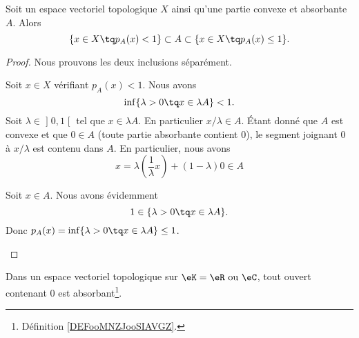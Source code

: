 \begin{lemma}			\label{LEMooFUXVooJumScW}
	Soit un espace vectoriel topologique \( X\) ainsi qu'une partie convexe et absorbante \( A\). Alors
	\begin{equation}
		\{ x\in X\tq p_A(x)<1 \}\subset A\subset\{ x\in X\tq p_A(x)\leq 1 \}.
	\end{equation}
\end{lemma}

\begin{proof}
	Nous prouvons les deux inclusions séparément.
	\begin{subproof}
		Soit \( x\in X\) vérifiant \( p_A(x)<1\). Nous avons
		\begin{equation}
			\inf\{ \lambda>0\tq x\in \lambda A \}<1.
		\end{equation}
		Soit \( \lambda\in \mathopen] 0,1\mathclose[\) tel que \( x\in \lambda A\). En particulier \( x/\lambda\in A\). Étant donné que \( A\) est convexe et que \( 0\in A\) (toute partie absorbante contient \( 0\)), le segment joignant \( 0\) à \( x/\lambda\) est contenu dans \( A\). En particulier, nous avons
		\begin{equation}
			x=\lambda\left( \frac{ 1 }{ \lambda }x  \right)+(1-\lambda)0\in A
		\end{equation}

		Soit \( x\in A\). Nous avons évidemment
		\begin{equation}
			1\in\{ \lambda >0\tq x\in \lambda A \}.
		\end{equation}
		Donc \( p_A(x)=\inf\{ \lambda >0\tq x\in \lambda A \}\leq 1\).
	\end{subproof}
\end{proof}

\begin{lemma}		\label{LEMooEEKYooVCnBMq}
	Dans un espace vectoriel topologique sur \( \eK=\eR\text{ ou }\eC\), tout ouvert contenant \( 0\) est absorbant\footnote{Définition \ref{DEFooMNZJooSIAVGZ}.}.
\end{lemma}

